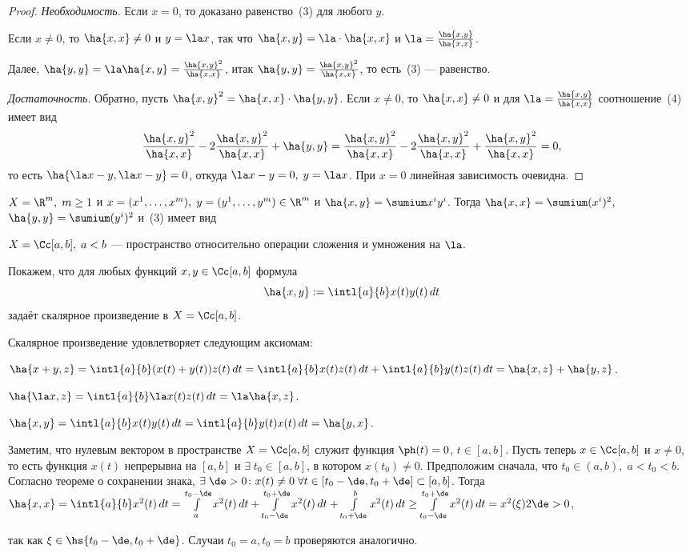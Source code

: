 \documentclass[a4paper]{article}
\begin{document}
\begin{proof}
\emph{Необходимость}. Если $x=0$, то доказано равенство~(3) для
любого $y$.

Если $x\ne0$, то $\ha{x,x}\ne0$ и $y=\la x$, так что
$\ha{x,y}=\la\cdot\ha{x,x}$ и $\la=\frac{\ha{x,y}}{\ha{x,x}}$.

Далее, $\ha{y,y}=\la\ha{x,y}=\frac{\ha{x,y}^2}{\ha{x,x}}$, итак
$\ha{y,y}=\frac{\ha{x,y}^2}{\ha{x,x}}$, то есть~(3) --- равенство.

\emph{Достаточность}. Обратно, пусть $\ha{x,y}^2=\ha{x,x}\cdot
\ha{y,y}$. Если $x\ne0$, то $\ha{x,x}\ne0$ и для
$\la=\frac{\ha{x,y}}{\ha{x,x}}$ соотношение~(4) имеет вид
$$\frac{\ha{x,y}^2}{\ha{x,x}}-2\frac{\ha{x,y}^2}{\ha{x,x}}+\ha{y,y} =
\frac{\ha{x,y}^2}{\ha{x,x}} - 2\frac{\ha{x,y}^2}{\ha{x,x}} +
\frac{\ha{x,y}^2}{\ha{x,x}}=0,$$ то есть $\ha{\la x-y,\la x-y}=0$,
откуда $\la x-y=0,\;y=\la x$. При $x=0$ линейная зависимость
очевидна.
\end{proof}
\begin{points}{-2}
\item $X=\R^m, \; m\ge1$ и $x=(x^1,\ldots,x^m), \;
y=(y^1,\ldots,y^m)\in\R^m$ и $\ha{x,y}=\sumium x^i y^i$. Тогда
$\ha{x,x}=\sumium (x^i)^2$, $\ha{y,y}=\sumium (y^i)^2$ и~(3) имеет
вид 

\item $X=\Cc[a,b], \; a<b$ --- пространство относительно операции
сложения и умножения на $\la$.
\end{points}

Покажем, что для любых функций $x,y\in\Cc[a,b]$ формула
$$\ha{x,y} := \intl{a}{b} x(t)y(t)\,dt$$
задаёт скалярное произведение в $X=\Cc[a,b]$.

Скалярное произведение удовлетворяет следующим аксиомам:

\begin{nums}{-2}
\item $\ha{x+y,z}=\intl{a}{b} (x(t)+y(t))z(t)\,dt= \intl{a}{b}
x(t)z(t)\,dt + \intl{a}{b} y(t)z(t)\,dt = \ha{x,z}+\ha{y,z}$.
\item $\ha{\la x,z}=\intl{a}{b} \la x(t)z(t)\,dt = \la \ha{x,z}$.
\item $\ha{x,y}=\intl{a}{b} x(t)y(t)\,dt = \intl{a}{b}
y(t)x(t)\,dt = \ha{y,x}$.
\end{nums}

Заметим, что нулевым вектором в пространстве $X=\Cc[a,b]$ служит
функция $\ph(t)=0$, $t\in[a,b]$. Пусть теперь $x\in\Cc[a,b]$ и
$x\ne0$, то есть функция $x(t)$ непрерывна на $[a,b]$ и $\exists\;
t_0\in[a,b]$, в котором $x(t_0)\ne0$. Предположим сначала, что
$t_0\in(a,b), \; a<t_0<b$. Согласно теореме о сохранении знака,
$\exists\;\de>0\colon x(t)\ne0 \; \forall t\in[t_0-\de,t_0+\de]
\subset [a,b]$. Тогда $\ha{x,x}=\intl{a}{b} x^2(t)\,dt =
\int\limits_a^{t_0-\de}x^2(t)\,dt +
\int\limits_{t_0-\de}^{t_0+\de}x^2(t)\,dt + \int\limits_{t_0+\de}^b
x^2(t)\,dt \ge \int\limits_{t_0-\de}^{t_0+\de} x^2(t)\,dt = x^2(\xi)
2\de > 0$, \par\noindent так как $\xi\in\hs{t_0-\de,t_0+\de}$.
Случаи $t_0=a,t_0=b$ проверяются аналогично.
\end{document}
